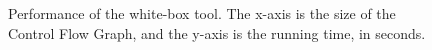 \begin{figure}[tb]
  \centering
  
  \caption{Performance of the white-box tool. The x-axis is the size
    of the Control Flow Graph, and the y-axis is the running time,
    in seconds.}
\end{figure}
